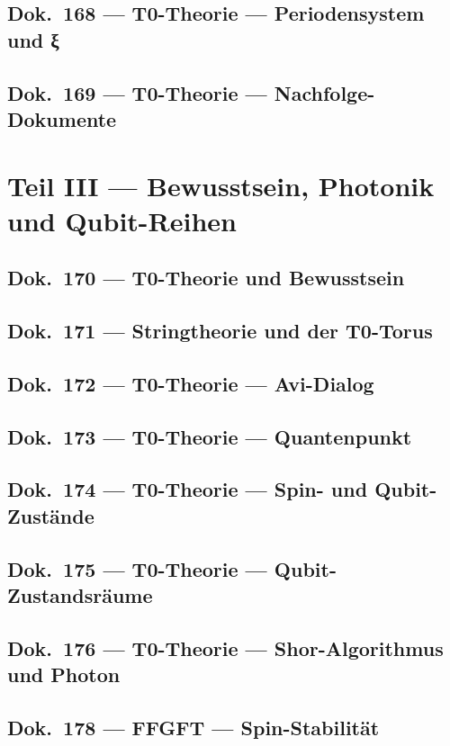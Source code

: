 	\chapter{Dok.~168 --- T0-Theorie — Periodensystem und ξ}
	
	\chapter{Dok.~169 --- T0-Theorie — Nachfolge-Dokumente}
	
	\part{Teil III --- Bewusstsein, Photonik und Qubit-Reihen}
	\chapter{Dok.~170 --- T0-Theorie und Bewusstsein}
	
	\chapter{Dok.~171 --- Stringtheorie und der T0-Torus}
	
	\chapter{Dok.~172 --- T0-Theorie — Avi-Dialog}
	
	\chapter{Dok.~173 --- T0-Theorie — Quantenpunkt}
	
	\chapter{Dok.~174 --- T0-Theorie — Spin- und Qubit-Zustände}
	
	\chapter{Dok.~175 --- T0-Theorie — Qubit-Zustandsräume}
	
	\chapter{Dok.~176 --- T0-Theorie — Shor-Algorithmus und Photon}
	
	\chapter{Dok.~178 --- FFGFT — Spin-Stabilität}
	

